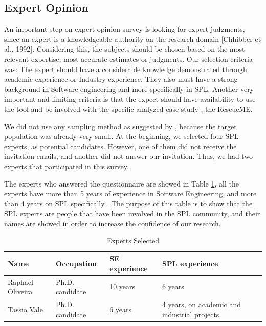 \subsection{Expert Opinion}

An  important  step  on expert opinion   survey  is  looking  for  expert  judgments,  since  an  expert  is  a knowledgeable authority on the research domain  [Chhibber et al., 1992].  Considering this, the subjects should be chosen based on the most relevant expertise, most accurate estimates or judgments. Our selection criteria was: The expert should have a considerable knowledge demonstrated through academic experience or Industry experience. They also must have a strong background in Software engineering and more specifically in \acf{SPL}. Another very important and limiting criteria is that the expect should have availability to use the tool and be involved with the specific analyzed case study , the RescueME.

We did not use any sampling method as suggested by \cite{Kitchenham2008}, because the target population was already very small. At the beginning, we selected four SPL experts, as potential candidates. However, one of them did not receive the invitation emails, and another did not answer our invitation. Thus, we had two experts that participated in this survey.  

The experts who answered the questionnaire are  showed in Table  \ref{table:expertsselected},  all the experts have more than 5 years of experience in Software Engineering, and more than 4 years on \ac{SPL} specifically . The purpose of this table is to show that the \ac{SPL} experts are people that have been involved in the SPL community, and their names are showed in order to increase the confidence of our research.

\begin{table}
\begin{center}
\centering
\small
\tabcolsep=0.11cm
    \begin{tabular}{|l|l|l|l|}
    \hline
    Name             & Occupation      & SE experience & SPL experience                     \\ \hline
    Raphael Oliveira & Ph.D. candidate & 10 years                        & 6 years                                               \\ \hline
    Tassio Vale      & Ph.D. candidate & 6 years                         & 4 years, on academic and industrial projects. \\ \hline
    \end{tabular}
        \caption {Experts Selected}
        \label{table:expertsselected}
        \end{center}

\end{table}

